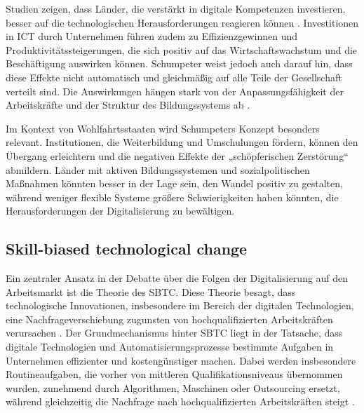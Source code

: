 Studien zeigen, dass Länder, die verstärkt in digitale Kompetenzen investieren, besser auf 
die technologischen Herausforderungen reagieren können 
\parencite[S. 15–17]{oecd2019measuring}. 
Investitionen in \ac{ICT} durch Unternehmen führen zudem zu Effizienzgewinnen und 
Produktivitätssteigerungen, die sich positiv auf das Wirtschaftswachstum und die 
Beschäftigung auswirken können. Schumpeter weist jedoch auch darauf hin, dass diese Effekte 
nicht automatisch und gleichmäßig auf alle Teile der Gesellschaft verteilt sind. Die 
Auswirkungen hängen stark von der Anpassungsfähigkeit der Arbeitskräfte und der Struktur 
des Bildungssystems ab \parencite[S. 48]{oecd2019measuring}.

Im Kontext von Wohlfahrtsstaaten wird Schumpeters Konzept besonders relevant. Institutionen, 
die Weiterbildung und Umschulungen fördern, können den Übergang erleichtern und die 
negativen Effekte der „schöpferischen Zerstörung“ abmildern. Länder mit aktiven 
Bildungssystemen und sozialpolitischen Maßnahmen könnten besser in der Lage sein, den Wandel 
positiv zu gestalten, während weniger flexible Systeme größere Schwierigkeiten haben 
könnten, die Herausforderungen der Digitalisierung zu bewältigen.


\subsection{Skill-biased technological change}

Ein zentraler Ansatz in der Debatte über die Folgen der Digitalisierung auf den Arbeitsmarkt 
ist die Theorie des \ac{SBTC}. Diese Theorie besagt, dass 
technologische Innovationen, insbesondere im Bereich der digitalen Technologien, eine 
Nachfrageverschiebung zugunsten von hochqualifizierten Arbeitskräften verursachen 
\parencite[vgl.][S. 25–26]{acemoglu2002technical}. Der Grundmechanismus hinter \ac{SBTC} liegt in der 
Tatsache, dass digitale Technologien und Automatisierungsprozesse bestimmte Aufgaben in 
Unternehmen effizienter und kostengünstiger machen. Dabei werden insbesondere 
Routineaufgaben, die vorher von mittleren Qualifikationsniveaus übernommen wurden, 
zunehmend durch Algorithmen, Maschinen oder Outsourcing ersetzt, während gleichzeitig die 
Nachfrage nach hochqualifizierten Arbeitskräften steigt 
\parencite[vgl.][S. 1282]{autor2003theskill}.

